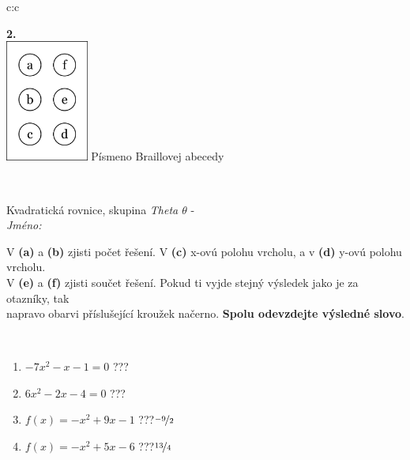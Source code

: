 \documentclass[10pt]{report}
\begin{document}
\begin{tabular}{c:c}
\begin{minipage}[c][104.5mm][t]{0.5\linewidth}
\begin{center}
\begin{minipage}{0.20\linewidth}
\begin{center}
{\Huge\bfseries 2.} \\[2mm]
\includegraphics[height=40mm]{../images/braille.png}
{\small Písmeno Braillovej abecedy}
\end{center}
\end{minipage}
\end{center}
\end{minipage}
\\ \hdashline
\begin{minipage}[c][104.5mm][t]{0.5\linewidth}
\begin{center}
\vspace{7mm}
{\huge Kvadratická rovnice, skupina \textit{Theta $\theta$} -}\\[5mm]
\textit{Jméno:}\phantom{xxxxxxxxxxxxxxxxxxxxxxxxxxxxxxxxxxxxxxxxxxxxxxxxxxxxxxxxxxxxxxxxx}\\[5mm]
\begin{minipage}{0.95\linewidth}
\begin{center}
V \textbf{(a)} a \textbf{(b)} zjisti počet řešení. V \textbf{(c)} x-ovú polohu vrcholu, a v \textbf{(d)} y-ovú polohu vrcholu.\\V \textbf{(e)} a \textbf{(f)} zjisti součet řešení. Pokud ti vyjde stejný výsledek jako je za otazníky, tak\\napravo obarvi příslušející kroužek načerno. \textbf{Spolu odevzdejte výsledné slovo}.
\end{center}
\end{minipage}
\\[1mm]
\begin{minipage}{0.79\linewidth}
\begin{center}
\begin{varwidth}{\linewidth}
\begin{enumerate}
\Large
\item $-7x^2-x-1=0$\quad \dotfill\; ???\;\dotfill {}
\item $6x^2-2x-4=0$\quad \dotfill\; ???\;\dotfill {}
\item $f(x)=-x^2+9x-1$\quad \dotfill\; ???\;\dotfill \quad $\nicefrac{-9}{2}$
\item $f(x)=-x^2+5x-6$\quad \dotfill\; ???\;\dotfill \quad $\nicefrac{13}{4}$

\end{enumerate}
\end{varwidth}
\end{center}
\end{minipage}
\end{center}
\end{minipage}
\end{tabular}
\end{document}
